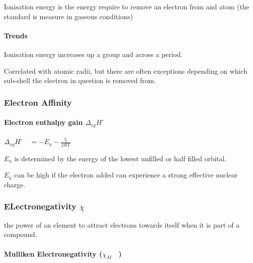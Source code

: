 \documentclass[]{article}
\let\oldparagraph\paragraph
\renewcommand{\paragraph}[1]{\oldparagraph{#1}\mbox{}}
\begin{document}
Ionisation energy is the energy require to remove an electron from and
atom (the standard is measure in gaseous conditions)

\hypertarget{trends-2}{%
\paragraph{Trends}\label{trends-2}}

Ionisation energy increases up a group and across a period.

Correlated with atomic radii, but there are often exceptions depending
on which sub-shell the electron in question is removed from.

\hypertarget{electron-affinity}{%
\subsubsection{Electron Affinity}\label{electron-affinity}}

\hypertarget{electron-enthalpy-gain-delta_eghcircquad}{%
\paragraph{\texorpdfstring{Electron enthalpy gain
\(\Delta_{eg}H^{\circ}\quad\)}{Electron enthalpy gain \textbackslash{}Delta\_\{eg\}H\^{}\{\textbackslash{}circ\}\textbackslash{}quad}}\label{electron-enthalpy-gain-delta_eghcircquad}}

\(\Delta_{eg}H^{\circ}\quad=-E_{a}-\frac{5}{2RT}\)

\(E_a\) is determined by the energy of the lowest unfilled or half
filled orbital.

\(E_a\) can be high if the electron added can experience a strong
effective nuclear charge.

\hypertarget{electronegativity-chiquad}{%
\subsubsection{\texorpdfstring{ELectronegativity
\(\chi\quad\)}{ELectronegativity \textbackslash{}chi\textbackslash{}quad}}\label{electronegativity-chiquad}}

the power of an element to attract electrons towards itself when it is
part of a compound.

\hypertarget{mulliken-electronegativity-chi_mquad}{%
\paragraph{\texorpdfstring{Mulliken Electronegativity
(\(\chi_{M}\quad\))}{Mulliken Electronegativity (\textbackslash{}chi\_\{M\}\textbackslash{}quad)}}\label{mulliken-electronegativity-chi_mquad}}
\end{document}
